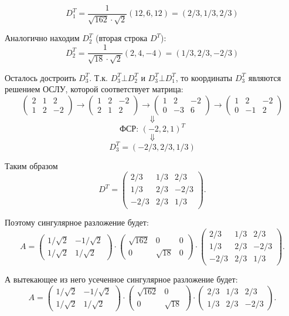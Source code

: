 \documentclass{article}
\begin{document}
$$D_1^T=\frac{1}{\sqrt{162}\cdot\sqrt{2}}(12, 6, 12)=(2/3,1/3,2/3)$$
\par
Аналогично находим $D_2^T$ (вторая строка $D^T$):
$$D_2^T=\frac{1}{\sqrt{18}\cdot\sqrt{2}}(2, 4, -4)=(1/3,2/3,-2/3)$$
\par
Осталось достроить $D_3^T$. Т.к. $D_3^T\bot D_2^T$ и $D_3^T\bot D_1^T$, то координаты $D_3^T$ являются решением ОСЛУ, которой соответствует матрица:
$$\left(\begin{array}{rrr}2 & 1 & 2\\1 & 2 & -2\end{array}\right)\rightarrow\left(\begin{array}{rrr}1 & 2 & -2\\2 & 1 & 2\end{array}\right)\rightarrow\left(\begin{array}{rrr}1 & 2 & -2\\0 & -3 & 6\end{array}\right)\rightarrow\left(\begin{array}{rrr}1 & 2 & -2\\0 & -1 & 2\end{array}\right)$$
$$\Downarrow$$
$$\textrm{ФСР: } (-2,2,1)^T$$
$$\Downarrow$$
$$D_3^T=(-2/3, 2/3, 1/3)$$
\par
Таким образом
$$D^T=\left(\begin{array}{rrr}2/3 & 1/3 & 2/3\\1/3 & 2/3 & -2/3\\-2/3 & 2/3 & 1/3\end{array}\right).$$
\par
Поэтому сингулярное разложение будет:
$$A=\left(\begin{array}{rr}1/\sqrt{2} & -1/\sqrt{2}\\1/\sqrt{2} & 1/\sqrt{2}\end{array}\right)\cdot\left(\begin{array}{rrr}\sqrt{162} & 0 & 0\\0 & \sqrt{18} & 0\end{array}\right)\cdot\left(\begin{array}{rrr}2/3 & 1/3 & 2/3\\1/3 & 2/3 & -2/3\\-2/3 & 2/3 & 1/3\end{array}\right).$$
\par
А вытекающее из него усеченное сингулярное разложение будет:
$$A=\left(\begin{array}{rr}1/\sqrt{2} & -1/\sqrt{2}\\1/\sqrt{2} & 1/\sqrt{2}\end{array}\right)\cdot\left(\begin{array}{rr}\sqrt{162} & 0\\0 & \sqrt{18}\end{array}\right)\cdot\left(\begin{array}{rrr}2/3 & 1/3 & 2/3\\1/3 & 2/3 & -2/3\end{array}\right).$$
\end{document}
